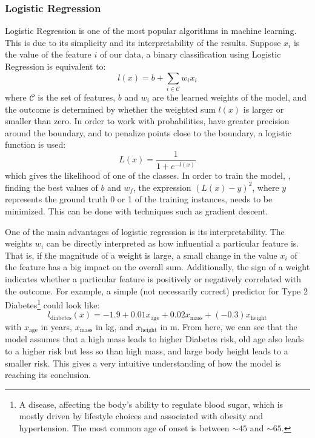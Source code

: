\subsubsection{Logistic Regression}
Logistic Regression is one of the most popular algorithms in machine learning.
This is due to its simplicity and its interpretability of the results.
Suppose $x_i$ is the value of the feature $i$ of our data, a binary classification using Logistic Regression is equivalent to:
\[
l(x) = b + \sum_{i \in \mathcal{C}} w_i x_i
\]
where $\mathcal{C}$ is the set of features, $b$ and $w_i$ are the learned weights of the model, and the outcome is determined by whether the weighted sum $l(x)$ is larger or smaller than zero.
In order to work with probabilities, have greater precision around the boundary, and to penalize points close to the boundary, a logistic function is used:
\[
L(x) = \frac{1}{1 + e^{-l(x)}}
\]
which gives the likelihood of one of the classes.
In order to train the model, \ie, finding the best values of $b$ and $w_f$, the expression $(L(x) - y)^2$, where $y$ represents the ground truth 0 or 1 of the training instances, needs to be minimized.
This can be done with techniques such as gradient descent.

One of the main advantages of logistic regression is its interpretability.
The weights $w_i$ can be directly interpreted as how influential a particular feature is.
That is, if the magnitude of a weight is large, a small change in the value $x_i$ of the feature has a big impact on the overall sum.
Additionally, the sign of a weight indicates whether a particular feature is positively or negatively correlated with the outcome.
For example, a simple (not necessarily correct) predictor for Type 2 Diabetes\footnote{A disease, affecting the body's ability to regulate blood sugar, which is mostly driven by lifestyle choices and associated with obesity and hypertension. The most common age of onset is between ${\sim}45$ and ${\sim}65$.} could look like:
\[
l_\text{diabetes}(x) = -1.9 + 0.01 x_\text{age} + 0.02 x_\text{mass} + (-0.3) x_\text{height}
\]
with $x_\text{age}$ in years, $x_\text{mass}$ in \si{kg}, and $x_\text{height}$ in \si{m}.
From here, we can see that the model assumes that a high mass leads to higher Diabetes risk, old age also leads to a higher risk but less so than high mass, and large body height leads to a smaller risk.
This gives a very intuitive understanding of how the model is reaching its conclusion.


